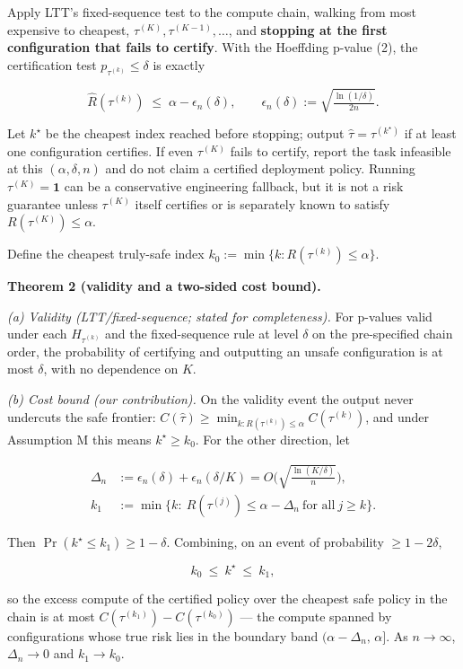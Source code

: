 \documentclass{ieeeaccess}
\begin{document}
Apply LTT's fixed-sequence test to the compute chain, walking from most expensive to cheapest, $\tau^{(K)},\tau^{(K-1)},\dots$, and \textbf{stopping at the first configuration that fails to certify}. With the Hoeffding p-value (2), the certification test $p_{\tau^{(k)}}\le\delta$ is exactly

\[
\hat R(\tau^{(k)})\;\le\;\alpha-\epsilon_n(\delta),
\qquad
\epsilon_n(\delta):=\sqrt{\tfrac{\ln(1/\delta)}{2n}} .
\]

Let $k^\star$ be the cheapest index reached before stopping; output $\hat\tau=\tau^{(k^\star)}$ if at least one configuration certifies. If even $\tau^{(K)}$ fails to certify, report the task infeasible at this $(\alpha,\delta,n)$ and do not claim a certified deployment policy. Running $\tau^{(K)}=\mathbf 1$ can be a conservative engineering fallback, but it is not a risk guarantee unless $\tau^{(K)}$ itself certifies or is separately known to satisfy $R(\tau^{(K)})\le\alpha$.

Define the cheapest truly-safe index $k_0:=\min\{k:R(\tau^{(k)})\le\alpha\}$.

\textbf{Theorem 2 (validity and a two-sided cost bound).}

\emph{(a) Validity (LTT/fixed-sequence; stated for completeness).} For p-values valid under each $H_{\tau^{(k)}}$ and the fixed-sequence rule at level $\delta$ on the pre-specified chain order, the probability of certifying and outputting an unsafe configuration is at most $\delta$, with no dependence on $K$.

\emph{(b) Cost bound (our contribution).} On the validity event the output never undercuts the safe frontier: $C(\hat\tau)\ge\min_{k:R(\tau^{(k)})\le\alpha}C(\tau^{(k)})$, and under Assumption M this means $k^\star\ge k_0$. For the other direction, let

\[
\begin{aligned}
\Delta_n&:=\epsilon_n(\delta)+\epsilon_n(\delta/K)
  =O\!\Big(\sqrt{\tfrac{\ln(K/\delta)}{n}}\Big),\\
k_1&:=\min\{k:\ R(\tau^{(j)})\le\alpha-\Delta_n
  \ \text{for all}\ j\ge k\}.
\end{aligned}
\]

Then $\Pr(k^\star\le k_1)\ge1-\delta$. Combining, on an event of probability $\ge1-2\delta$,

\[
k_0\ \le\ k^\star\ \le\ k_1,
\]

so the excess compute of the certified policy over the cheapest safe policy in the chain is at most $C(\tau^{(k_1)})-C(\tau^{(k_0)})$ --- the compute spanned by configurations whose true risk lies in the boundary band $(\alpha-\Delta_n,\,\alpha]$. As $n\to\infty$, $\Delta_n\to0$ and $k_1\to k_0$.
\end{document}
